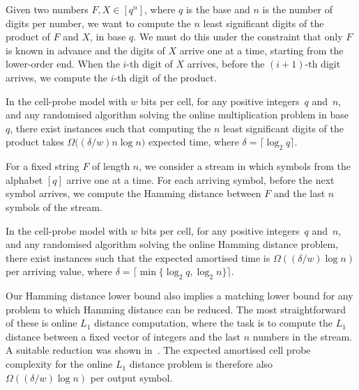 \documentclass{toc}
\begin{document}
%

%
%
%
%

\begin{problem}
Given two numbers $F,X\in [q^n]$, where $q$ is the base and $n$ is the number of digits per number, we want to
%
compute   %
the $n$ least significant digits of the product of $F$ and $X$, in base $q$.
	We must do this under the constraint that only $F$ is known in advance and the digits of $X$ arrive one at a time, starting from the lower-order end.
	When the $i$-th digit of $X$
%
arrives,   %
before the $(i+1)$-th digit
%
arrives,   %
we
%
compute   %
the $i$-th digit of the product.
\end{problem}

\begin{theorem}
	\label{thm:mult}
	In the cell-probe model with $w$ bits per cell, for any positive integers~$q$ and~$n$, and any randomised algorithm solving the online multiplication problem in base~$q$, there exist instances such that
%
computing    %
the $n$ least significant digits of the product takes $\Omega{(({\delta}/{w})n\log n})$ expected time, where $\delta=\lceil \log_2q \rceil$.
\end{theorem}

%

%

\begin{problem}
  For a fixed string $F$ of length $n$, we consider a stream in which symbols from the alphabet $[q]$ arrive one at a time. For each arriving symbol, before the next symbol arrives, we
%
compute   %
the Hamming distance between $F$ and the last $n$ symbols of the stream.
\end{problem}

\begin{theorem}
	\label{thm:ham}
	In the cell-probe model with $w$ bits per cell, for any positive integers~$q$ and~$n$, and any randomised algorithm solving the online Hamming distance problem, there exist instances such that the expected amortised time is $\Omega(({\delta}/{w})\log n)$ per arriving value, where $\delta=\lceil \min\{\log_2q,\log_2n\} \rceil$.
\end{theorem}

%

%

Our Hamming distance lower bound also implies a matching lower bound for any problem
%
to which Hamming distance can be reduced.   %
The most straightforward of these is online $L_1$ distance computation, where the task is to
%
compute   %
the $L_1$ distance between a fixed vector of integers and the last $n$ numbers in the stream.
A suitable reduction was shown in~\cite{LP:2008}. The expected amortised cell probe complexity for the online $L_1$ distance problem is therefore also $\Omega{(({\delta}/{w}) \log n)}$ per
%
output symbol.  %
\end{document}
